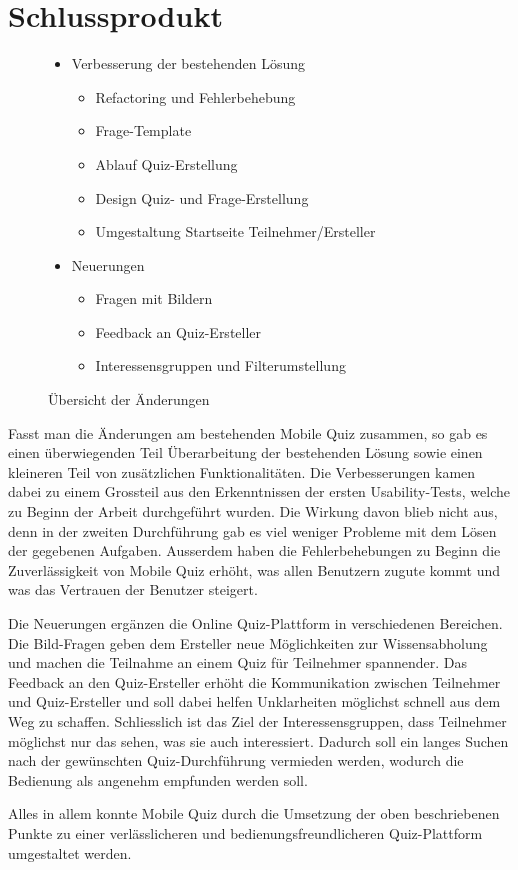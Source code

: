 \newpage
\section{Schlussprodukt}

\begin{figure}[H]
	\centering
	\begin{itemize}
		\item Verbesserung der bestehenden Lösung
		\begin{itemize}
			\item \gls{Refactoring} und Fehlerbehebung
			\item Frage-Template
			\item Ablauf Quiz-Erstellung
			\item Design Quiz- und Frage-Erstellung
			\item Umgestaltung Startseite Teilnehmer/Ersteller
		\end{itemize}
		\item Neuerungen
		\begin{itemize}
			\item Fragen mit Bildern
			\item Feedback an Quiz-Ersteller
			\item Interessensgruppen und Filterumstellung
		\end{itemize}
	\end{itemize}
	\caption{Übersicht der Änderungen}
\end{figure}

Fasst man die Änderungen am bestehenden Mobile Quiz zusammen, so gab es einen überwiegenden Teil Überarbeitung der bestehenden Lösung sowie einen kleineren Teil von zusätzlichen Funktionalitäten. Die Verbesserungen kamen dabei zu einem Grossteil aus den Erkenntnissen der ersten \gls{Usability-Test}s, welche zu Beginn der Arbeit durchgeführt wurden. Die Wirkung davon blieb nicht aus, denn in der zweiten Durchführung gab es viel weniger Probleme mit dem Lösen der gegebenen Aufgaben.
Ausserdem haben die Fehlerbehebungen zu Beginn die Zuverlässigkeit von Mobile Quiz erhöht, was allen Benutzern zugute kommt und was das Vertrauen der Benutzer steigert.

Die Neuerungen ergänzen die Online Quiz-Plattform in verschiedenen Bereichen. Die Bild-Fragen geben dem Ersteller neue Möglichkeiten zur Wissensabholung und machen die Teilnahme an einem Quiz für Teilnehmer spannender.
Das Feedback an den Quiz-Ersteller erhöht die Kommunikation zwischen Teilnehmer und Quiz-Ersteller und soll dabei helfen Unklarheiten möglichst schnell aus dem Weg zu schaffen.
Schliesslich ist das Ziel der Interessensgruppen, dass Teilnehmer möglichst nur das sehen, was sie auch interessiert. Dadurch soll ein langes Suchen nach der gewünschten Quiz-Durchführung vermieden werden, wodurch die Bedienung als angenehm empfunden werden soll.

\bigskip

Alles in allem konnte Mobile Quiz durch die Umsetzung der oben beschriebenen Punkte zu einer verlässlicheren und bedienungsfreundlicheren Quiz-Plattform umgestaltet werden.

